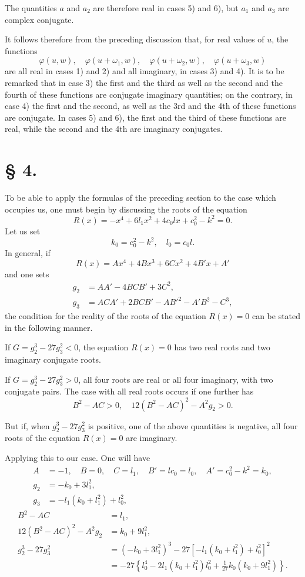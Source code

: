 \documentclass{article}
\begin{document}
The quantities $a$ and $a_2$ are therefore real in cases 5) and 6), but $a_1$ and $a_3$ are complex conjugate.

It follows therefore from the preceding discussion that, for real values of $u$, the functions
\[
\varphi(u, w), \quad \varphi(u + \omega_1, w), \quad \varphi(u + \omega_2, w), \quad \varphi(u + \omega_3, w)
\]
are all real in cases 1) and 2) and all imaginary, in cases 3) and 4). It is to be remarked that in case 3) the first and the third as well as the second and the fourth of these functions are conjugate imaginary quantities; on the contrary, in case 4) the first and the second, as well as the 3rd and the 4th of these functions are conjugate.
In cases 5) and 6), the first and the third of these functions are real, while the second and the 4th are imaginary conjugates.


\section*{§ 4.}
\setcounter{equation}{0}

To be able to apply the formulas of the preceding section to the case which occupies us, one must begin by discussing the roots of the equation
\[
R(x) = -x^4 + 6l_1x^2 + 4c_0lx + c_0^2 - k^2 = 0.
\]
Let us set
\[
k_0 = c_0^2 - k^2, \quad l_0 = c_0l.
\]
In general, if
\[
R(x) = Ax^4 + 4Bx^3 + 6Cx^2 + 4B'x + A'
\]
and one sets
\begin{align*}
g_2 &= AA' - 4BCB' + 3C^2, \\
g_3 &= ACA' + 2BCB' - AB'^2 - A'B^2 - C^3,
\end{align*}
the condition for the reality of the roots of the equation $R(x) = 0$ can be stated in the following manner.

If $G = g_2^3 - 27g_3^2 < 0$, the equation $R(x) = 0$ has two real roots and two imaginary conjugate roots.

If $G = g_2^3 - 27g_3^2 > 0$, all four roots are real or all four imaginary, with two conjugate pairs. The case with all real roots occurs if one further has
\[
B^2 - AC > 0, \quad 12(B^2 - AC)^2 - A^2g_2 > 0.
\]

But if, when $g_2^3 - 27g_3^2$ is positive, one of the above quantities is negative, all four roots of the equation $R(x) = 0$ are imaginary.

Applying this to our case. One will have
\begin{align*}
A &= -1, \quad B = 0, \quad C = l_1, \quad B' = lc_0 = l_0, \quad A' = c_0^2 - k^2 = k_0, \\
g_2 &= -k_0 + 3l_1^2, \\
g_3 &= -l_1(k_0+l_1^2) + l_0^2,
\end{align*}
\begin{align*}
B^2 - AC &= l_1, \\
12(B^2 - AC)^2 - A^2g_2 &= k_0 + 9l_1^2, \\
g_2^3 - 27g_3^2 &= (-k_0 + 3l_1^2)^3 - 27[-l_1(k_0 + l_1^2) + l_0^2]^2 \\
&= -27\left\{l_0^4 - 2l_1(k_0 + l_1^2)l_0^2 + \frac{1}{27}k_0\left(k_0+9l_1^2\right)\right\}.
\end{align*}
\end{document}
